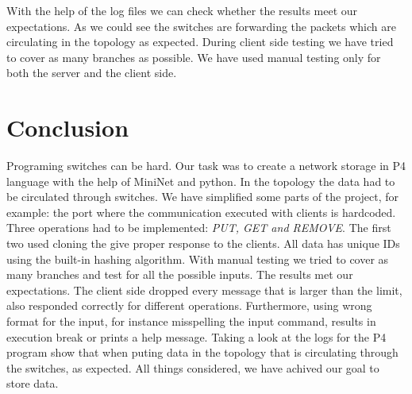 \documentclass[sigconf,natbib=false]{acmart}
\begin{document}
With the help of the log files we can check whether the results meet our expectations. As we could see the switches are forwarding the packets which are circulating in the topology as expected. During client side testing we have tried to cover as many branches as possible. We have used manual testing only for both the server and the client side.
\section{Conclusion}
Programing switches can be hard. Our task was to create a network storage in P4 language with the help of MiniNet and python. In the topology the data had to be circulated through switches. We have simplified some parts of the project, for example: the port where the communication executed with clients is hardcoded. Three operations had to be implemented: \textit{PUT, GET and REMOVE}. The first two used cloning the give proper response to the clients. All data has unique IDs using the built-in hashing algorithm. With manual testing we tried to cover as many branches and test for all the possible inputs. The results met our expectations. The client side dropped every message that is larger than the limit, also responded correctly for different operations. Furthermore, using wrong format for the input, for instance misspelling the input command, results in execution break or prints a help message. Taking a look at the logs for the P4 program show that when puting data in the topology that is circulating through the switches, as expected. All things considered, we have achived our goal to store data.


\printbibliography
\end{document}
